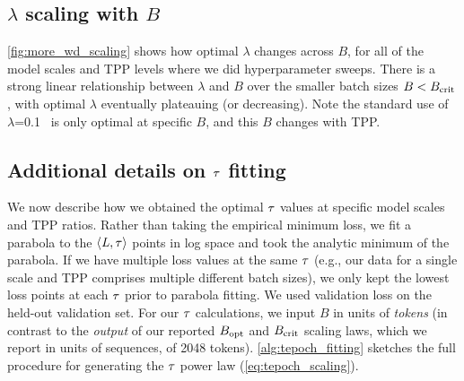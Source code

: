 \subsection{$\lambda$ scaling with $B$}



\cref{fig:more_wd_scaling} shows how optimal $\lambda$ changes across
$B$, for all of the model scales and TPP levels where we did
hyperparameter sweeps.
%
There is a strong linear relationship between $\lambda$ and $B$ over
the smaller batch sizes $B < B_{\text{crit}}$, with optimal $\lambda$
eventually plateauing (or decreasing).
%
Note the standard use of
$\lambda$=0.1~\citep{hoffmann2022empirical,brown2020language,almazrouei2023falcon,alephalpha2024introducing}
is only optimal at specific $B$, and this $B$ changes with TPP\@.


\subsection{Additional details on $\tau$ fitting}\label{sec:appendix_tepoch_fitting}



We now describe how we obtained the optimal $\tau$ values at specific
model scales and TPP ratios.
%
Rather than taking the empirical minimum loss, we fit a parabola to
the $\langle \mathit{L}, \tau \rangle$ points in log space and took
the analytic minimum of the parabola.  If we have multiple loss values
at the same $\tau$ (e.g., our data for a single scale and TPP
comprises multiple different batch sizes), we only kept the lowest
loss points at each $\tau$ prior to parabola fitting.
%
We used validation loss on the held-out validation set.
%
For our $\tau$ calculations, we input $B$ in units of \emph{tokens}
(in contrast to the \emph{output} of our reported $B_{\text{opt}}$ and $B_{\text{crit}}$
scaling laws, which we report in units of sequences, of 2048 tokens).
%
\cref{alg:tepoch_fitting} sketches the full procedure for generating
the $\tau$ power law (\cref{eq:tepoch_scaling}).
%

